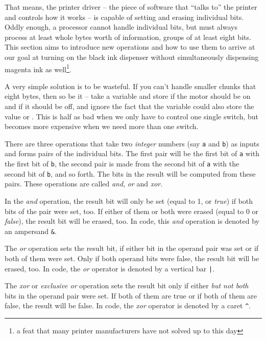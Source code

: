 {That means, the printer driver -- the piece of software that \enquote{talks to} the printer and controls how it works -- is capable of setting and erasing individual bits. Oddly enough, a processor cannot handle individual bits, but must always process at least whole bytes worth of information, \ie groups of at least eight bits. This section aims to introduce new operations and how to use them to arrive at our goal at turning on the black ink dispenser without simultaneously dispensing magenta ink as well\footnote{a feat that many printer manufacturers have not solved up to this day}.

A very simple solution is to be wasteful. If you can't handle smaller chunks that eight bytes, then so be it -- take a  variable and store  if the motor should be on and  if it should be off, and ignore the fact that the variable could also store the value  or . This is half as bad when we only have to control one single switch, but becomes more expensive when we need more than one switch.

There are three operations that take two \emph{integer} numbers (say \texttt{a} and \texttt{b}) as inputs and forms pairs of the individual bits. The first pair will be the first bit of \texttt{a} with the first bit of \texttt{b}, the second pair is made from the second bit of \texttt{a} with the second bit of \texttt{b}, and so forth. The bits in the result will be computed from these pairs. These operations are called \emph{and}, \emph{or} and \emph{xor}.

In the \emph{and} operation, the result bit will only be set (equal to 1, or \emph{true}) if both bits of the pair were set, too. If either of them or both were erased (equal to 0 or \emph{false}), the result bit will be erased, too. In code, this \emph{and} operation is denoted by an ampersand \texttt{\&}.

The \emph{or} operation sets the result bit, if either bit in the operand pair was set or if both of them were set. Only if both operand bits were false, the result bit will be erased, too. In code, the \emph{or} operator is denoted by a vertical bar \texttt{|}.

The \emph{xor} or \emph{exclusive or} operation sets the result bit only if either \emph{but not both} bits in the operand pair were set. If both of them are true or if both of them are false, the result will be false. In code, the \emph{xor} operator is denoted by a caret \texttt{\textasciicircum}.

}
